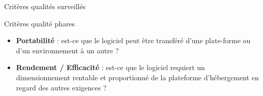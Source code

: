 \begin{frame}{Critères qualités surveillés}
    \begin{block}{Critères qualité phares}
        \begin{itemize}
            \item \textbf{Portabilité} : est-ce que le logiciel peut être transféré d’une plate-forme ou d’un environnement à un autre ?
            \item \textbf{Rendement / Efficacité} : est-ce que le logiciel requiert un dimensionnement rentable et proportionné de la plateforme d’hébergement en regard des autres exigences ?
        \end{itemize}
    \end{block}
\end{frame}

